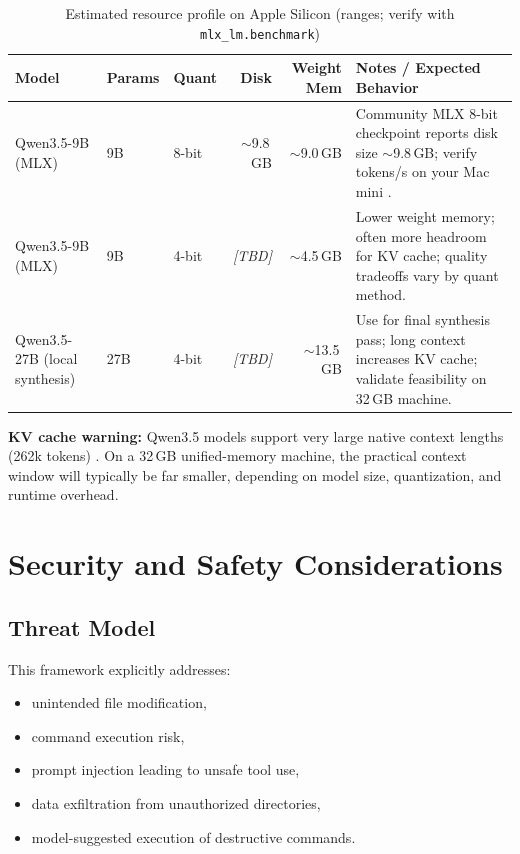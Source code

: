 \documentclass[11pt]{article}
\begin{document}
\begin{table}[H]
\centering
\caption{Estimated resource profile on Apple Silicon (ranges; verify with \texttt{mlx\_lm.benchmark})}
\label{tab:model_resources}
\begin{tabularx}{\textwidth}{@{}l l l r r X@{}}
\toprule
\textbf{Model} & \textbf{Params} & \textbf{Quant} & \textbf{Disk} & \textbf{Weight Mem} & \textbf{Notes / Expected Behavior} \\
\midrule
Qwen3.5-9B (MLX) & 9B & 8-bit & \(\sim\)9.8\,GB & \(\sim\)9.0\,GB & Community MLX 8-bit checkpoint reports disk size \(\sim\)9.8\,GB; verify tokens/s on your Mac mini \cite{MLXCommunity_Qwen35_9B_MLX8}. \\
Qwen3.5-9B (MLX) & 9B & 4-bit & \textit{[TBD]} & \(\sim\)4.5\,GB & Lower weight memory; often more headroom for KV cache; quality tradeoffs vary by quant method. \\
Qwen3.5-27B (local synthesis) & 27B & 4-bit & \textit{[TBD]} & \(\sim\)13.5\,GB & Use for final synthesis pass; long context increases KV cache; validate feasibility on 32\,GB machine. \\
\bottomrule
\end{tabularx}
\end{table}

\begin{EngineeringBox}
\textbf{KV cache warning:} Qwen3.5 models support very large native context lengths (262k tokens) \cite{Qwen35_9B_BaseCard, Qwen35_27B_Card}. On a 32\,GB unified-memory machine, the practical context window will typically be far smaller, depending on model size, quantization, and runtime overhead.
\end{EngineeringBox}

\section{Security and Safety Considerations}

\subsection{Threat Model}

This framework explicitly addresses:
\begin{itemize}
  \item unintended file modification,
  \item command execution risk,
  \item prompt injection leading to unsafe tool use,
  \item data exfiltration from unauthorized directories,
  \item model-suggested execution of destructive commands.
\end{itemize}
\end{document}
